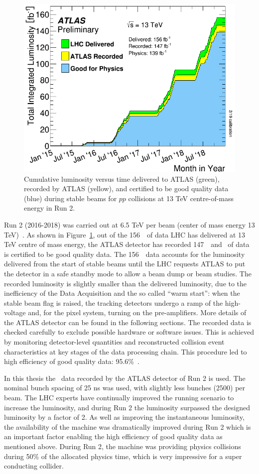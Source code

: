 \begin{figure}[bht]
	\begin{centering}	
	\includegraphics[width=.6\textwidth]{Detector_plots/Run2_lumi.png}
	\caption{Cumulative luminosity versus time delivered to 
	ATLAS (green), recorded by ATLAS (yellow), and certified to be 
	good quality data (blue) during stable beams for $pp$ collisions 
	at 13 TeV centre-of-mass energy in Run 2. 
		}
	\label{fig:Run2_lumi}
	\end{centering}
\end{figure}

Run 2 (2016-2018) was carried out
at 6.5 TeV per beam (center of mass energy 13 TeV)~\cite{LHC-Run2-Operation}. 
As shown in Figure~\ref{fig:Run2_lumi}, out of the 156~\fb\ 
of data LHC has delivered at 13 TeV centre of mass energy, the ATLAS detector has recorded 
147~\fb\ and \lumi\ of data is certified to be good quality data.
The 156~\fb\ data accounts for the luminosity delivered from the start of 
stable beams until the LHC requests ATLAS to put the detector in a 
safe standby mode to allow a beam dump or beam studies. 
The recorded luminosity is slightly smaller than the delivered luminosity, due 
to the inefficiency of the Data Acquisition and the so called ``warm start'': 
when the stable beam flag is raised, 
the tracking detectors undergo a ramp of the high-voltage and, 
for the pixel system, turning on the pre-amplifiers. 
More details of the ATLAS detector can be found in the following sections. 
The recorded data is checked carefully to exclude possible hardware or software  issues. 
This is achieved by monitoring detector-level quantities 
and reconstructed collision event characteristics at key stages of the data processing chain.
This procedure led to high efficiency of good quality data: 95.6\%~\cite{aad2020atlas}.	



In this thesis the \lumi\ data recorded by the ATLAS detector of Run 2 is used.
The nominal bunch spacing of 25 ns was used, with slightly less bunches (2500) per beam.
The LHC experts have continually improved the running scenario to increase the luminosity,
and during Run 2 the luminosity surpassed the designed luminosity by a factor of 2. 
As well as improving the instantaneous luminosity, the availability of the machine
was dramatically improved during Run 2 which is an important factor enabling the high efficiency 
of good quality data as mentioned above.
During Run 2, the machine was providing physics collisions during 50\% of 
the allocated physics time, which is very impressive for a super conducting collider. 

